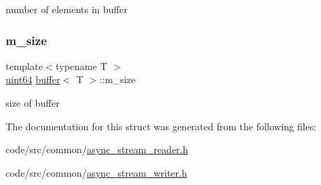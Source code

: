 number of elements in buffer 

\mbox{\label{structbuffer_a120b15f6f771bc004c80d12eb881623f}} 
\subsubsection{\texorpdfstring{m\+\_\+size}{m\_size}}
{\footnotesize\ttfamily template$<$typename T $>$ \\
\hyperlink{types_8h_a60e8696a4678cd348e991a1f172e53f7}{uint64} \hyperlink{structbuffer}{buffer}$<$ T $>$\+::m\+\_\+size}



size of buffer 



The documentation for this struct was generated from the following files\+:\begin{DoxyCompactItemize}
\item 
code/src/common/\hyperlink{async__stream__reader_8h}{async\+\_\+stream\+\_\+reader.\+h}\item 
code/src/common/\hyperlink{async__stream__writer_8h}{async\+\_\+stream\+\_\+writer.\+h}\end{DoxyCompactItemize}
